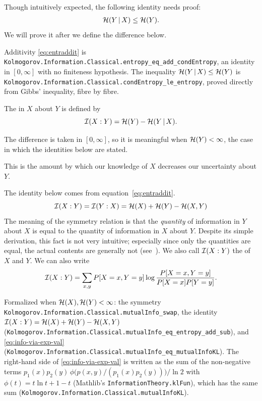 Though intuitively expected, the following identity needs proof:
 \begin{align*}
   \mathcal{H}(Y\,\vert\, X) \le \mathcal{H}(Y).
 \end{align*}
We will prove it after we define the difference below.

\begin{formalization}
Additivity \eqref{eq:entraddit} is
\texttt{Kolmogorov.Information.Classical.entropy\_eq\_add\_condEntropy}, an identity in
\( [0, \infty] \) with no finiteness hypothesis. The inequality
\( \mathcal{H}(Y \,\vert\, X) \le \mathcal{H}(Y) \) is
\texttt{Kolmogorov.Information.Classical.condEntropy\_le\_entropy}, proved directly from
Gibbs' inequality, fibre by fibre.
\end{formalization}

 \begin{definition}
  \label{def:g3.1.3}
  \leanok
The  in \( X \) about \( Y \) is defined by
 \[
 \mathcal{I}(X : Y) = \mathcal{H}(Y) - \mathcal{H}(Y \,\vert\, X).
 \]
\end{definition}

\begin{formalization}
The difference is taken in \( [0, \infty] \), so it is meaningful when
\( \mathcal{H}(Y) < \infty \), the case in which the identities below are stated.
\end{formalization}

This is the amount by which our knowledge of \( X \) decreases our 
uncertainty about \( Y \).

The identity below comes from equation~\eqref{eq:entraddit}.
 \[
 \mathcal{I}(X : Y) = \mathcal{I}(Y : X) = \mathcal{H}(X) + \mathcal{H}(Y) - \mathcal{H}(X,Y)
 \]
The meaning of the symmetry relation is 
that the \emph{quantity} of information in \( Y \) about
\( X \) is equal to the quantity of information in \( X \) about \( Y \). 
Despite its simple derivation, this fact is not very intuitive; especially
since only the quantities are equal, the actual contents are generally
not (see~\cite{GacsKornComnInf73}). 
We also call \( \mathcal{I}(X : Y) \) the  of \( X \) and \( Y \).
We can also write
 \begin{align}\label{eq:info-via-exp-val}
   \mathcal{I}(X : Y) = \sum_{x,y}P[X=x,Y=y]\log\frac{P[X=x,Y=y]}{P[X=x]P[Y=y]}.
 \end{align}

\begin{formalization}
Formalized when \( \mathcal{H}(X), \mathcal{H}(Y) < \infty \): the symmetry
\texttt{Kolmogorov.Information.Classical.mutualInfo\_swap}, the identity
\( \mathcal{I}(X : Y) = \mathcal{H}(X) + \mathcal{H}(Y) - \mathcal{H}(X,Y) \)
(\texttt{Kolmogorov.Information.Classical.mutualInfo\_eq\_entropy\_add\_sub}), and
\eqref{eq:info-via-exp-val}
(\texttt{Kolmogorov.Information.Classical.mutualInfo\_eq\_mutualInfoKL}). The right-hand side
of \eqref{eq:info-via-exp-val} is written as the sum of the non-negative terms
\( p_{1}(x) p_{2}(y)\, \phi\bigl(p(x,y)/(p_{1}(x) p_{2}(y))\bigr) / \ln 2 \) with
\( \phi(t) = t \ln t + 1 - t \) (Mathlib's \texttt{InformationTheory.klFun}), which has the
same sum (\texttt{Kolmogorov.Information.Classical.mutualInfoKL}).
\end{formalization}


